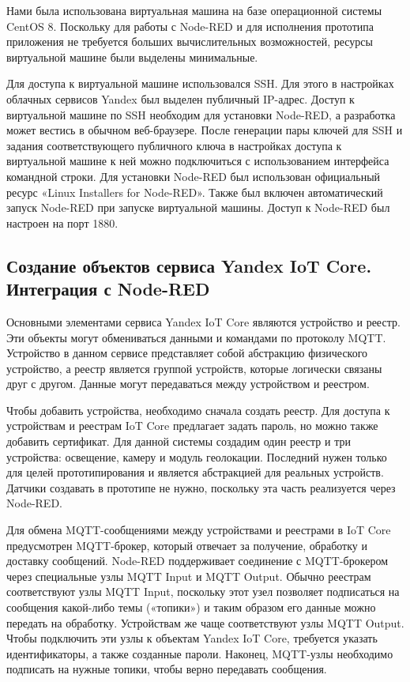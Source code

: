 Нами была использована виртуальная машина на базе операционной системы CentOS 8. Поскольку для работы с Node-RED и для исполнения прототипа приложения не требуется больших вычислительных возможностей, ресурсы виртуальной машине были выделены минимальные.

Для доступа к виртуальной машине использовался SSH. Для этого в настройках облачных сервисов Yandex был выделен публичный IP-адрес. Доступ к виртуальной машине по SSH необходим для установки Node-RED, а разработка может вестись в обычном веб-браузере. После генерации пары ключей для SSH и задания соответствующего публичного ключа в настройках доступа к виртуальной машине к ней можно подключиться с использованием интерфейса командной строки. Для установки Node-RED был использован официальный ресурс «Linux Installers for Node-RED». Также был включен автоматический запуск Node-RED при запуске виртуальной машины. Доступ к Node-RED был настроен на порт 1880.
\subsection {Создание объектов сервиса Yandex IoT Core. Интеграция с Node-RED}
Основными элементами сервиса Yandex IoT Core являются устройство и реестр. Эти объекты могут обмениваться данными и командами по протоколу MQTT. Устройство в данном сервисе представляет собой абстракцию физического устройство, а реестр является группой устройств, которые логически связаны друг с другом. Данные могут передаваться между устройством и реестром.

Чтобы добавить устройства, необходимо сначала создать реестр. Для доступа к устройствам и реестрам IoT Core предлагает задать пароль, но можно также добавить сертификат. Для данной системы создадим один реестр и три устройства: освещение, камеру и модуль геолокации. Последний нужен только для целей прототипирования и является абстракцией для реальных устройств. Датчики создавать в прототипе не нужно, поскольку эта часть реализуется через Node-RED.

Для обмена MQTT-сообщениями между устройствами и реестрами в IoT Core предусмотрен MQTT-брокер, который отвечает за получение, обработку и доставку сообщений. Node-RED поддерживает соединение с MQTT-брокером через специальные узлы MQTT Input и MQTT Output. Обычно реестрам соответствуют узлы MQTT Input, поскольку этот узел позволяет подписаться на сообщения какой-либо темы («топики») и таким образом его данные можно передать на обработку. Устройствам же чаще соответствуют узлы MQTT Output. Чтобы подключить эти узлы к объектам Yandex IoT Core, требуется указать идентификаторы, а также созданные пароли. Наконец, MQTT-узлы необходимо подписать на нужные топики, чтобы верно передавать сообщения.

